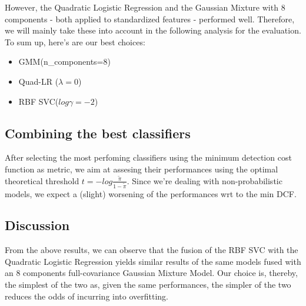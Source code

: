 However, the Quadratic Logistic Regression and the Gaussian Mixture with 8 components - both applied to standardized features - performed well. Therefore, we will mainly take these into account in the following analysis for the evaluation.
To sum up, here's are our best choices:
\begin{itemize}
	\item GMM(n\_components=8)
	\item Quad-LR ($\lambda=0$)
	\item RBF SVC($log \gamma=-2$)
\end{itemize}


\subsection{Combining the best classifiers}
After selecting the most perfoming classifiers using the minimum detection cost function as metric, we aim at assesing their performances using the optimal theoretical threshold $t = - log \frac{\tilde{\pi}}{1-\tilde{\pi}}$. Since we're dealing with non-probabilistic models, we expect a (slight) worsening of the performances wrt to the min DCF.

 \subsection{Discussion}
 From the above results, we can observe that the fusion of the RBF SVC with the Quadratic Logistic Regression yields similar results of the same models fused with an 8 components full-covariance Gaussian Mixture Model. Our choice is, thereby, the simplest of the two as, given the same performances, the simpler of the two reduces the odds of incurring into overfitting. 